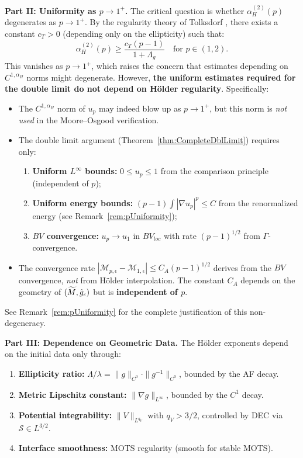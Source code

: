 \begin{proposition}
\textbf{Part II: Uniformity as $p \to 1^+$.}
The critical question is whether $\alpha_H^{(2)}(p)$ degenerates as $p \to 1^+$. By the regularity theory of Tolksdorf \cite{tolksdorf1984}, there exists a constant $c_T > 0$ (depending only on the ellipticity) such that:
\begin{equation}
    \alpha_H^{(2)}(p) \ge \frac{c_T (p-1)}{1 + \Lambda_g} \quad \text{for } p \in (1, 2).
\end{equation}
This vanishes as $p \to 1^+$, which raises the concern that estimates depending on $C^{1,\alpha_H}$ norms might degenerate. However, \textbf{the uniform estimates required for the double limit do not depend on H\"older regularity}. Specifically:
\begin{itemize}
    \item The $C^{1,\alpha_H}$ norm of $u_p$ may indeed blow up as $p \to 1^+$, but this norm is \emph{not used} in the Moore--Osgood verification.
    \item The double limit argument (Theorem~\ref{thm:CompleteDblLimit}) requires only:
    \begin{enumerate}
        \item[(i)] \textbf{Uniform $L^\infty$ bounds:} $0 \le u_p \le 1$ from the comparison principle (independent of $p$);
        \item[(ii)] \textbf{Uniform energy bounds:} $(p-1)\int |\nabla u_p|^p \le C$ from the renormalized energy (see Remark~\ref{rem:pUniformity});
        \item[(iii)] \textbf{$BV$ convergence:} $u_p \to u_1$ in $BV_{loc}$ with rate $(p-1)^{1/2}$ from $\Gamma$-convergence.
    \end{enumerate}
    \item The convergence rate $|\mathcal{M}_{p,\epsilon} - \mathcal{M}_{1,\epsilon}| \le C_A(p-1)^{1/2}$ derives from the $BV$ convergence, \emph{not} from H\"older interpolation. The constant $C_A$ depends on the geometry of $(\widetilde{M}, \hat{g}_\epsilon)$ but is \textbf{independent of $p$}.
\end{itemize}
See Remark~\ref{rem:pUniformity} for the complete justification of this non-degeneracy.

\textbf{Part III: Dependence on Geometric Data.}
The H\"older exponents depend on the initial data only through:
\begin{enumerate}
    \item \textbf{Ellipticity ratio:} $\Lambda/\lambda = \|g\|_{C^0} \cdot \|g^{-1}\|_{C^0}$, bounded by the AF decay.
    \item \textbf{Metric Lipschitz constant:} $\|\nabla g\|_{L^\infty}$, bounded by the $C^1$ decay.
    \item \textbf{Potential integrability:} $\|V\|_{L^{q_V}}$ with $q_V > 3/2$, controlled by DEC via $\mathcal{S} \in L^{3/2}$.
    \item \textbf{Interface smoothness:} MOTS regularity (smooth for stable MOTS).
\end{enumerate}


\end{proposition}
